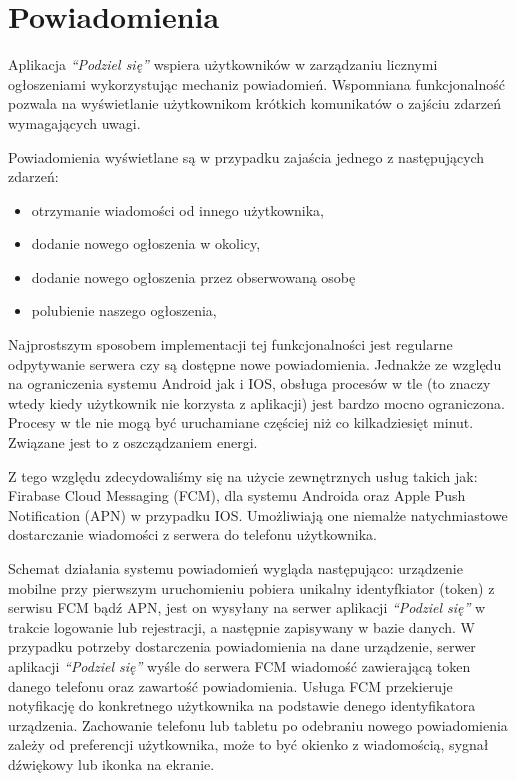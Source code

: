\documentclass[licencjacka]{pracamgr}
\begin{document}
\section{Powiadomienia}

Aplikacja \textit{``Podziel się''} wspiera użytkowników w zarządzaniu licznymi ogłoszeniami wykorzystując mechaniz powiadomień. Wspomniana funkcjonalność pozwala na wyświetlanie użytkownikom krótkich komunikatów o zajściu zdarzeń wymagających uwagi.

Powiadomienia wyświetlane są w przypadku zajaścia jednego z następujących zdarzeń:
\begin{itemize}
\setlength\itemsep{-0.2em}
    \item otrzymanie wiadomości od innego użytkownika,
    \item dodanie nowego ogłoszenia w okolicy,
    \item dodanie nowego ogłoszenia przez obserwowaną osobę
    \item polubienie naszego ogłoszenia,
\end{itemize}{}

Najprostszym sposobem implementacji tej funkcjonalności jest regularne odpytywanie serwera czy są dostępne nowe powiadomienia. Jednakże ze względu na ograniczenia systemu Android jak i IOS, obsługa procesów w tle (to znaczy wtedy kiedy użytkownik nie korzysta z aplikacji) jest bardzo mocno ograniczona. Procesy w tle nie mogą być uruchamiane częściej niż co kilkadziesięt minut. Związane jest to z oszcządzaniem energi.

Z tego względu zdecydowaliśmy się na użycie zewnętrznych usług takich jak: Firabase Cloud Messaging (FCM), dla systemu Androida oraz Apple Push Notification (APN) w przypadku IOS. Umożliwiają one niemalże natychmiastowe dostarczanie wiadomości z serwera do telefonu użytkownika.

Schemat działania systemu powiadomień wygląda następująco: urządzenie mobilne przy pierwszym uruchomieniu pobiera unikalny identyfkiator (token) z serwisu FCM bądź APN, jest on wysyłany na serwer aplikacji \textit{``Podziel się''} w trakcie logowanie lub rejestracji, a następnie zapisywany w bazie danych. W przypadku potrzeby dostarczenia powiadomienia na dane urządzenie, serwer aplikacji \textit{``Podziel się''} wyśle do serwera FCM wiadomość zawierającą token danego telefonu oraz zawartość powiadomienia. Usługa FCM przekieruje notyfikację do konkretnego użytkownika na podstawie denego identyfikatora urządzenia. Zachowanie telefonu lub tabletu po odebraniu nowego powiadomienia zależy od preferencji użytkownika, może to być okienko z wiadomością, sygnał dźwiękowy lub ikonka na ekranie.
\end{document}

